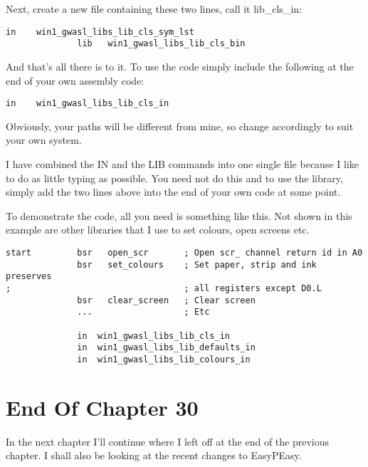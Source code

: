 Next, create a new file containing these two lines, call it
 lib\_cls\_in:

\begin{lstlisting}[firstnumber=1,caption={Example Library - Lib\_cls\_in},label={lst:LibClsIn}]
              in    win1_gwasl_libs_lib_cls_sym_lst
              lib   win1_gwasl_libs_lib_cls_bin 
\end{lstlisting}

And that's all there is to it. To use the code simply include the
    following at the end of your own assembly code: 

\begin{lstlisting}[firstnumber=1,caption={Example Library - Invoking the Library},label={lst:LibClsInvoke}]
              in    win1_gwasl_libs_lib_cls_in
\end{lstlisting}

Obviously, your paths will be different from mine, so change
    accordingly to suit your own system. 

I have combined the IN and the LIB commands into one single file
    because I like to do as little typing as possible. You need not do this
    and to use the library, simply add the two lines above into the end of
    your own code at some point.

To demonstrate the code, all you need is something like this. Not
    shown in this example are other libraries that I use to set colours, open
    screens etc. 

\begin{lstlisting}[firstnumber=1,caption={Example Library - Brief Example of Use},label={lst:LibClsExampleUse}]
start         bsr   open_scr       ; Open scr_ channel return id in A0
              bsr   set_colours    ; Set paper, strip and ink preserves
;                                  ; all registers except D0.L
              bsr   clear_screen   ; Clear screen  
              ...                  ; Etc

              in  win1_gwasl_libs_lib_cls_in
              in  win1_gwasl_libs_lib_defaults_in
              in  win1_gwasl_libs_lib_colours_in
\end{lstlisting}

\section{End Of Chapter 30}
\label{ch30-the-end}%

In the next chapter I'll continue where I left off at the end of the previous chapter. I shall also be
    looking at the recent changes to EasyPEasy.


